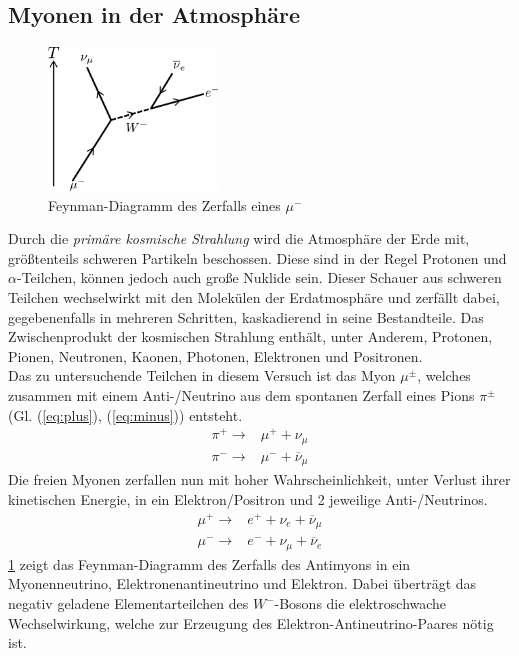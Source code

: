 \documentclass[numbers=noenddot,12pt,a4paper]{scrartcl}
\newcommand{\tilt}[1]{\textit{#1}}
\begin{document}
\subsection{Myonen in der Atmosphäre}
\begin{figure}
	\centering
	\includegraphics[width=0.4\textwidth]{Muon_Decay.pdf}
	\caption{Feynman-Diagramm des Zerfalls eines $\mu^-$}\label{img:zerfall}
\end{figure}
Durch die \tilt{primäre kosmische Strahlung} wird die Atmosphäre der Erde mit, größtenteils schweren Partikeln beschossen. Diese sind in der Regel Protonen und $\alpha$-Teilchen, können jedoch auch große Nuklide sein. Dieser Schauer aus schweren Teilchen wechselwirkt mit den Molekülen der Erdatmosphäre und zerfällt dabei, gegebenenfalls in mehreren Schritten, kaskadierend in seine Bestandteile. Das Zwischenprodukt der kosmischen Strahlung enthält, unter Anderem, Protonen, Pionen, Neutronen, Kaonen, Photonen, Elektronen und Positronen.\\
Das zu untersuchende Teilchen in diesem Versuch ist das Myon $\mu^\pm$, welches zusammen mit einem Anti-/Neutrino aus dem spontanen Zerfall eines Pions $\pi^\pm$ (Gl. (\ref{eq:plus}), (\ref{eq:minus})) entsteht.
\begin{align}
\pi^+\rightarrow&\mu^++\nu_\mu \label{eq:plus}\\
\pi^-\rightarrow&\mu^-+\overline{\nu}_\mu \label{eq:minus}
\end{align}
Die freien Myonen zerfallen nun mit hoher Wahrscheinlichkeit, unter Verlust ihrer kinetischen Energie, in ein Elektron/Positron und 2 jeweilige Anti-/Neutrinos.
\begin{align}
\mu^+\rightarrow& e^++\nu_e+\overline{\nu}_\mu\\
\mu^-\rightarrow& e^-+\nu_\mu+\overline{\nu}_e
\end{align}
\ref{img:zerfall} zeigt das Feynman-Diagramm des Zerfalls des Antimyons in ein Myonenneutrino, Elektronenantineutrino und Elektron. Dabei überträgt das negativ geladene Elementarteilchen des $W^-$-Bosons die elektroschwache Wechselwirkung, welche zur Erzeugung des Elektron-Antineutrino-Paares nötig ist.\\
\end{document}
